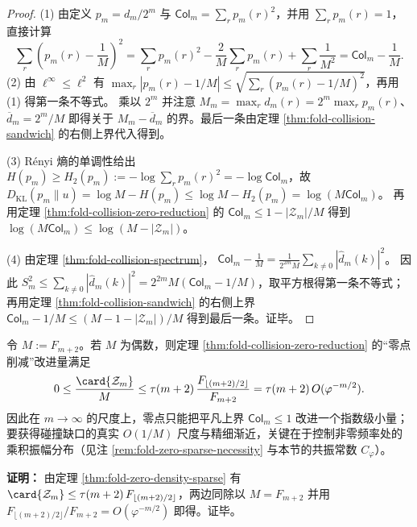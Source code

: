 \begin{proof}
(1) 由定义 \(p_m=d_m/2^m\) 与 \(\mathsf{Col}_m=\sum_r p_m(r)^2\)，并用 \(\sum_r p_m(r)=1\)，直接计算
\[
\sum_r\left(p_m(r)-\frac{1}{M}\right)^2
=\sum_r p_m(r)^2-\frac{2}{M}\sum_r p_m(r)+\sum_r\frac{1}{M^2}
=\mathsf{Col}_m-\frac{1}{M}.
\]
(2) 由 \(\ell^\infty\le \ell^2\) 有 \(\max_r|p_m(r)-1/M|\le \sqrt{\sum_r(p_m(r)-1/M)^2}\)，再用 (1) 得第一条不等式。
乘以 \(2^m\) 并注意 \(M_m=\max_r d_m(r)=2^m\max_r p_m(r)\)、\(\overline d_m=2^m/M\) 即得关于 \(M_m-\overline d_m\) 的界。最后一条由定理 \ref{thm:fold-collision-sandwich} 的右侧上界代入得到。
\par
(3) Rényi 熵的单调性给出 \(H(p_m)\ge H_2(p_m):=-\log\sum_r p_m(r)^2=-\log \mathsf{Col}_m\)，故
\(
D_{\mathrm{KL}}(p_m\|u)=\log M-H(p_m)\le \log M-H_2(p_m)=\log(M\mathsf{Col}_m)
\)。
再用定理 \ref{thm:fold-collision-zero-reduction} 的 \(\mathsf{Col}_m\le 1-|\mathcal{Z}_m|/M\) 得到 \(\log(M\mathsf{Col}_m)\le \log(M-|\mathcal{Z}_m|)\)。
\par
(4) 由定理 \ref{thm:fold-collision-spectrum}，
\(
\mathsf{Col}_m-\frac{1}{M}=\frac{1}{2^{2m}M}\sum_{k\ne 0}|\widehat d_m(k)|^2
\)。
因此 \(S_m^2\le \sum_{k\ne 0}|\widehat d_m(k)|^2=2^{2m}M(\mathsf{Col}_m-1/M)\)，取平方根得第一条不等式；
再用定理 \ref{thm:fold-collision-sandwich} 的右侧上界 \(\mathsf{Col}_m-1/M\le (M-1-|\mathcal{Z}_m|)/M\) 得到最后一条。证毕。
\end{proof}

\begin{corollary}[零点削减项的相对指数小量]
\label{cor:fold-collision-zero-sparsity-impact}
令 \(M:=F_{m+2}\)。若 \(M\) 为偶数，则定理 \ref{thm:fold-collision-zero-reduction} 的“零点削减”改进量满足
\[
0\le \frac{\card{\mathcal{Z}_m}}{M}
\le
\tau(m+2)\,\frac{F_{\lfloor (m+2)/2\rfloor}}{F_{m+2}}
=\tau(m+2)\,O(\varphi^{-m/2}).
\]
因此在 \(m\to\infty\) 的尺度上，零点只能把平凡上界 \(\mathsf{Col}_m\le 1\) 改进一个指数级小量；要获得碰撞缺口的真实 \(O(1/M)\) 尺度与精细渐近，关键在于控制非零频率处的乘积振幅分布（见注 \ref{rem:fold-zero-sparse-necessity} 与本节的共振常数 \(C_\varphi\)）。
\end{corollary}

\textbf{证明：}
由定理 \ref{thm:fold-zero-density-sparse} 有 \(\card{\mathcal{Z}_m}\le \tau(m+2)\,F_{\lfloor (m+2)/2\rfloor}\)，两边同除以 \(M=F_{m+2}\) 并用 \(F_{\lfloor (m+2)/2\rfloor}/F_{m+2}=O(\varphi^{-m/2})\) 即得。证毕。




